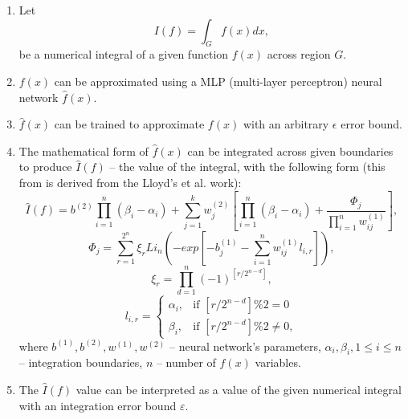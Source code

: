 \documentclass[%
]{ittmm}
\begin{document}
\begin{enumerate}
    \item Let 
        \begin{equation}
            I(f) = \int_G f(x)dx,
        \end{equation}
        be a numerical integral of a given function $ f(x) $ across region $G$.
    \item $ f(x) $ can be approximated using a MLP (multi-layer perceptron) neural network $ \hat{f}(x) $.
    \item $ \hat{f}(x) $ can be trained to approximate $ f(x) $ with an arbitrary $ \epsilon $ error bound.
    \item The mathematical form of $ \hat{f}(x) $ can be integrated across given boundaries to produce $\hat{I}(f)$ -- the value of the integral, with the following form (this from is derived from the Lloyd's et al. work\cite{lloyd2020using}):
        \begin{equation}
        \label{eq:numerical_method_1}
            \hat{I}(f) = b^{(2)}\prod_{i=1}^{n}(\beta_i - \alpha_i) + \sum_{j=1}^{k}w_j^{(2)}[\prod_{i=1}^{n}(\beta_i - \alpha_i) + \frac{\Phi_j}{\prod_{i=1}^{n}w_{ij}^{(1)}}],
        \end{equation}
        \begin{equation}
        \label{eq:numerical_method_2}
            \Phi_j = \sum_{r=1}^{2^n}\xi_{r}Li_n(-exp[-b_j^{(1)} - \sum_{i=1}^{n}w_{ij}^{(1)}l_{i,r}]),
        \end{equation}
        \begin{equation}
        \label{eq:numerical_method_3}
            \xi_{r} = \prod_{d=1}^{n}(-1)^{[{r}/{2^{n-d}}]},
        \end{equation}
        \begin{equation}
        \label{eq:numerical_method_4}
            l_{i,r} = \left\{
            \begin{array}{ll}
                \alpha_i, & \text{if } [{r}/{2^{n-d}}] \% 2 = 0 \\
                \beta_i, & \text{if } [{r}/{2^{n-d}}] \% 2 \neq 0,
            \end{array}
        \right.
        \end{equation}
    where $b^{(1)}, b^{(2)}, w^{(1)}, w^{(2)}$ -- neural network's parameters, $\alpha_i, \beta_i, 1 \leq i \leq n$ -- integration boundaries, $n$ -- number of $ f(x) $ variables.
    \item The $\hat{I}(f)$ value can be interpreted as a value of the given numerical integral with an integration error bound $\varepsilon$.
\end{enumerate}
\end{document}

